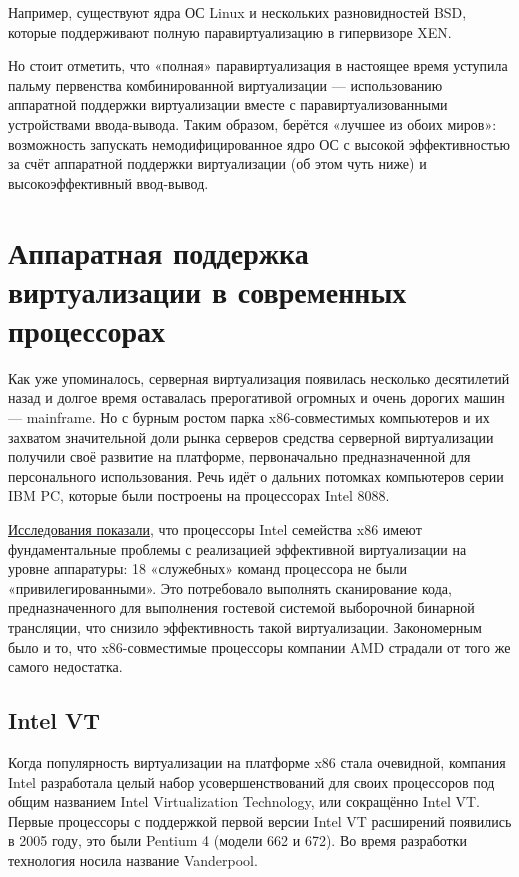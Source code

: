 \documentclass[14pt, a4paper]{article}
\begin{document}
Например, существуют ядра ОС Linux и нескольких разновидностей BSD, которые поддерживают
полную паравиртуализацию в гипервизоре XEN.

Но стоит отметить, что «полная» паравиртуализация в настоящее время уступила пальму первенства
комбинированной виртуализации — использованию аппаратной поддержки виртуализации вместе с
паравиртуализованными устройствами ввода-вывода. Таким образом, берётся «лучшее из обоих
миров»: возможность запускать немодифицированное ядро ОС с высокой эффективностью за счёт
аппаратной поддержки виртуализации (об этом чуть ниже) и высокоэффективный ввод-вывод. \newpage


\section*{Аппаратная поддержка виртуализации в современных процессорах}

Как уже упоминалось, серверная виртуализация появилась несколько десятилетий назад и долгое
время оставалась прерогативой огромных и очень дорогих машин — mainframe. Но с бурным ростом
парка x86-совместимых компьютеров и их захватом значительной доли рынка серверов средства
серверной виртуализации получили своё развитие на платформе, первоначально предназначенной
для персонального использования. Речь идёт о дальних потомках компьютеров серии IBM PC,
которые были построены на процессорах Intel 8088.

\href{http://www.usenix.org/events/sec2000/robin.html}{Исследования показали},
что процессоры Intel семейства x86 имеют фундаментальные проблемы с
реализацией эффективной виртуализации на уровне аппаратуры: 18 «служебных» команд
процессора не были «привилегированными». Это потребовало выполнять сканирование кода,
предназначенного для выполнения гостевой системой выборочной бинарной трансляции, что снизило
эффективность такой виртуализации. Закономерным было и то, что x86-совместимые процессоры
компании AMD страдали от того же самого недостатка.\\


\subsection*{Intel VT}

Когда популярность виртуализации на платформе x86 стала очевидной, компания Intel разработала
целый набор усовершенствований для своих процессоров под общим названием Intel Virtualization
Technology, или сокращённо Intel VT. Первые процессоры с поддержкой первой версии Intel VT
расширений появились в 2005 году, это были Pentium 4 (модели 662 и 672). Во время разработки
технология носила название Vanderpool.
\end{document}
